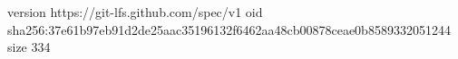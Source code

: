 version https://git-lfs.github.com/spec/v1
oid sha256:37e61b97eb91d2de25aac35196132f6462aa48cb00878ceae0b8589332051244
size 334
